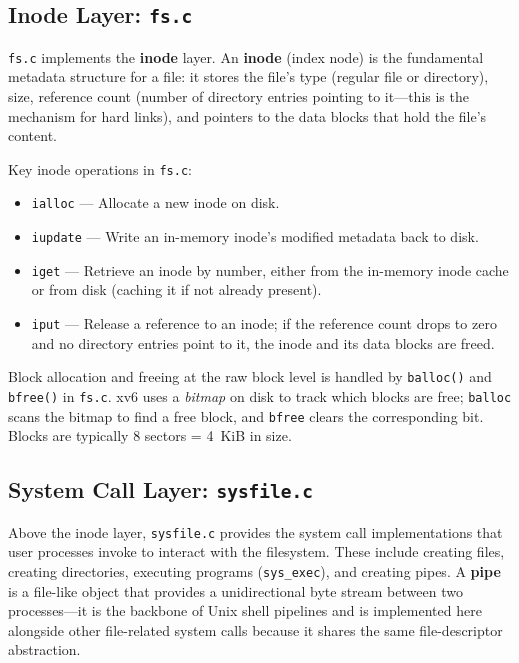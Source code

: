 \documentclass[11pt]{article}
\begin{document}
\subsection{Inode Layer: \texttt{fs.c}}

\texttt{fs.c} implements the \textbf{inode} layer. An \textbf{inode} (index node) is the fundamental metadata structure for a file: it stores the file's type (regular file or directory), size, reference count (number of directory entries pointing to it---this is the mechanism for hard links), and pointers to the data blocks that hold the file's content.

Key inode operations in \texttt{fs.c}:

\begin{itemize}
    \item \texttt{ialloc} --- Allocate a new inode on disk.
    \item \texttt{iupdate} --- Write an in-memory inode's modified metadata back to disk.
    \item \texttt{iget} --- Retrieve an inode by number, either from the in-memory inode cache or from disk (caching it if not already present).
    \item \texttt{iput} --- Release a reference to an inode; if the reference count drops to zero and no directory entries point to it, the inode and its data blocks are freed.
\end{itemize}

Block allocation and freeing at the raw block level is handled by \texttt{balloc()} and \texttt{bfree()} in \texttt{fs.c}. xv6 uses a \emph{bitmap} on disk to track which blocks are free; \texttt{balloc} scans the bitmap to find a free block, and \texttt{bfree} clears the corresponding bit. Blocks are typically 8 sectors = 4~KiB in size.

\subsection{System Call Layer: \texttt{sysfile.c}}

Above the inode layer, \texttt{sysfile.c} provides the system call implementations that user processes invoke to interact with the filesystem. These include creating files, creating directories, executing programs (\texttt{sys\_exec}), and creating pipes. A \textbf{pipe} is a file-like object that provides a unidirectional byte stream between two processes---it is the backbone of Unix shell pipelines and is implemented here alongside other file-related system calls because it shares the same file-descriptor abstraction.
\end{document}
